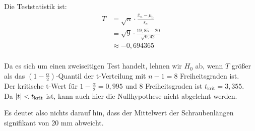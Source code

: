 \documentclass[main.tex]{subfiles}
\begin{document}
Die Teststatistik ist:
$$\begin{aligned}
    T &= \sqrt{n} \cdot \frac{\overline{x}_n - \mu_0}{s_n} \\
    &= \sqrt{9} \cdot \frac{19,85 - 20}{\sqrt{0,42}} \\
    &\approx - 0,694365 \\
\end{aligned}
$$

Da es sich um einen zweiseitigen Test handelt, lehnen wir $H_0$ ab, wenn $T$ größer als das $(1-\frac{\alpha}{2})$-Quantil der t-Verteilung mit $n-1=8$ Freiheitsgraden ist.\\

Der kritische t-Wert für $1-\frac{\alpha}{2} = 0,995$ und 8 Freiheitsgraden ist $t_{\text{krit}} = 3,355$.\\

Da $\lvert t\rvert < t_{\text{krit}}$ ist, kann auch hier die Nullhypothese nicht abgelehnt werden.

Es deutet also nichts darauf hin, dass der Mittelwert der Schraubenlängen signifikant von 20 mm abweicht.
\end{document}
